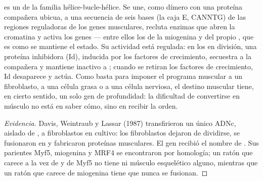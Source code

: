 \begin{proposition}\label{prop:b2:cell-differentiation:myod}
 es un  de la familia hélice-bucle-hélice. Se
une, como dímero con una proteína compañera ubicua, a una secuencia de
seis bases (la caja E, CANNTG) de las regiones reguladoras de los genes
musculares, recluta enzimas que abren la cromatina y activa los genes
--- entre ellos los de la miogenina y del propio , que es como se
mantiene el estado. Su actividad está regulada: en los  en
división, una proteína inhibidora (Id), inducida por los factores de
crecimiento, secuestra a la compañera y mantiene inactivo a ; cuando
se retiran los factores de crecimiento, Id desaparece y  actúa. Como
 basta para imponer el programa muscular a un fibroblasto, a una
célula grasa o a una célula nerviosa, el destino muscular tiene, en cierto
sentido, un solo gen de profundidad: la dificultad de convertirse en
músculo no está en saber cómo, sino en recibir la orden.
\end{proposition}
\begin{proof}[Evidencia]
Davis, Weintraub y Lassar (1987) transfirieron un único ADNc, aislado de
, a fibroblastos en cultivo: los fibroblastos dejaron de
dividirse, se fusionaron en  y fabricaron proteínas musculares. El
gen recibió el nombre de . Sus parientes Myf5, miogenina y MRF4 se
encontraron por homología; un ratón que carece a la vez de  y de Myf5
no tiene  ni músculo esquelético alguno, mientras que un ratón
que carece de miogenina tiene  que nunca se fusionan.
\end{proof}

